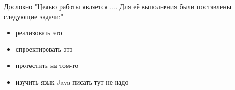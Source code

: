  Дословно "Целью работы является .... Для её выполнения были поставлены следующие задачи:"
 \begin{itemize}
 \item реализовать это
 \item спроектировать это
 \item протестить на том-то
 \item  \sout{изучить язык Java} писать тут не надо
 \end{itemize}